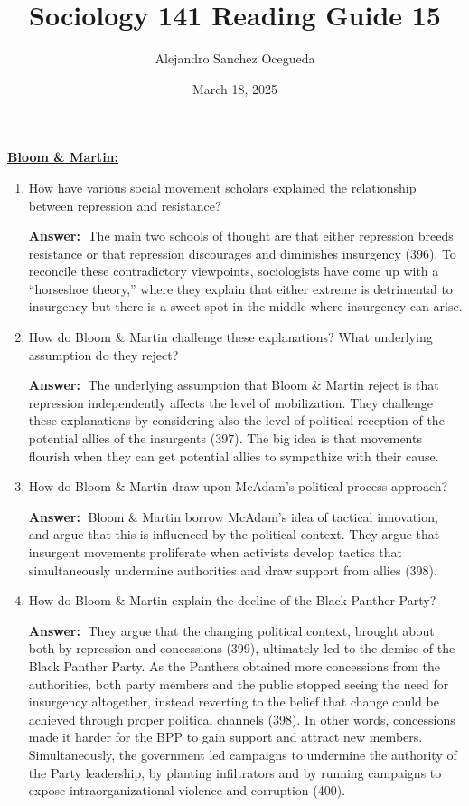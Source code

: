 \documentclass{article}
\title{Sociology 141 Reading Guide 15}
\author{Alejandro Sanchez Ocegueda}
\date{March 18, 2025}
\newcommand{\answer}{\textbf{Answer:}$\;$}
\begin{document}
\maketitle

\underline{\textbf{Bloom \& Martin:}}
    

\begin{enumerate}[label=\arabic*)]
    \item How have various social movement scholars explained the relationship between repression and resistance?
    
    \answer 
    The main two schools of thought are that either repression breeds resistance or that repression discourages and diminishes insurgency (396).
    To reconcile these contradictory viewpoints, sociologists have come up with a ``horseshoe theory,'' where they explain that either extreme is detrimental to insurgency but there is a sweet spot in the middle where insurgency can arise.
    
    \item How do Bloom \& Martin challenge these explanations? 
    What underlying assumption do they reject?
    
    \answer 
    The underlying assumption that Bloom \& Martin reject is that repression independently affects the level of mobilization.
    They challenge these explanations by considering also the level of political reception of the potential allies of the insurgents (397).
    The big idea is that movements flourish when they can get potential allies to sympathize with their cause.
    
    \item How do Bloom \& Martin draw upon McAdam's political process approach?
   

    \answer
    Bloom \& Martin borrow McAdam's idea of tactical innovation, and argue that this is influenced by the political context.
    They argue that insurgent movements proliferate when activists develop tactics that simultaneously undermine authorities and draw support from allies (398).
    
    \item How do Bloom \& Martin explain the decline of the Black Panther Party?
    
    \answer
    They argue that the changing political context, brought about both by repression and concessions (399), ultimately led to the demise of the Black Panther Party.
    As the Panthers obtained more concessions from the authorities, both party members and the public stopped seeing the need for insurgency altogether, instead reverting to the belief that change could be achieved through proper political channels (398).
    In other words, concessions made it harder for the BPP to gain support and attract new members.
    Simultaneously, the government led campaigns to undermine the authority of the Party leadership, by planting infiltrators and by running campaigns to expose intraorganizational violence and corruption (400).

\end{enumerate}
\end{document}
